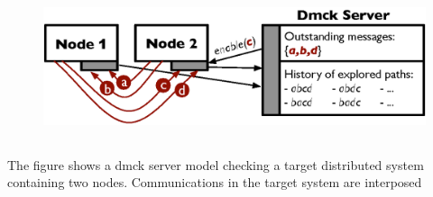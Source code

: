 
\begin{figure}

\centerline{
\includegraphics[height=1.7in]{F/dmck/dmck-simple.eps}
}
\vminfive
{}
\end{figure}

The figure shows a dmck server model checking
a target distributed system containing two nodes.  
Communications in the target system are interposed 
\fi


